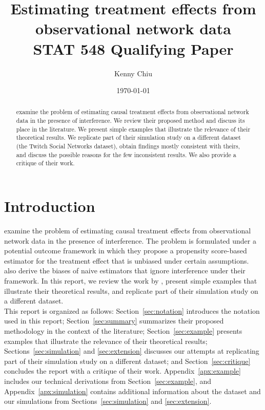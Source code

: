 \documentclass[10pt]{article}
\title{Estimating treatment effects from observational network data\\\vspace{0.5em}\large{STAT 548 Qualifying Paper}}
\author{Kenny Chiu}
\date{\today}
\begin{document}
\maketitle

\vspace{2em}

\begin{abstract}
\textcite{Forastiere:2021} examine the problem of estimating causal treatment effects from observational network data in the presence of interference. We review their proposed method and discuss its place in the literature. We present simple examples that illustrate the relevance of their theoretical results. We replicate part of their simulation study on a different dataset (the Twitch Social Networks dataset), obtain findings mostly consistent with theirs, and discuss the possible reasons for the few inconsistent results. We also provide a critique of their work.
\end{abstract}

\vspace{2em}


\section{Introduction}

\textcite{Forastiere:2021} examine the problem of estimating causal treatment effects from observational network data in the presence of interference. The problem is formulated under a potential outcome framework in which they propose a propensity score-based estimator for the treatment effect that is unbiased under certain assumptions. \citeauthor{Forastiere:2021} also derive the biases of naive estimators that ignore interference under their framework. In this report, we review the work by \textcite{Forastiere:2021}, present simple examples that illustrate their theoretical results, and replicate part of their simulation study on a different dataset.
\\

This report is organized as follows: Section~\ref{sec:notation} introduces the notation used in this report; Section~\ref{sec:summary} summarizes their proposed methodology in the context of the literature; Section~\ref{sec:example} presents examples that illustrate the relevance of their theoretical results; Sections~\ref{sec:simulation} and \ref{sec:extension} discusses our attempts at replicating part of their simulation study on a different dataset; and Section~\ref{sec:critique} concludes the report with a critique of their work. Appendix~\ref{apx:example} includes our technical derivations from Section~\ref{sec:example}, and Appendix~\ref{apx:simulation} contains additional information about the dataset and our simulations from Sections~\ref{sec:simulation} and \ref{sec:extension}.
\end{document}
